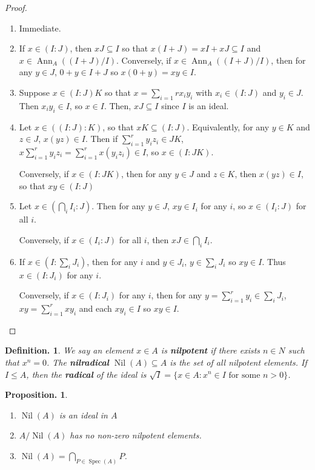 \documentclass[11pt, a4paper]{memoir}
\theoremstyle{change}
\newtheorem{proposition}[theorem]{Proposition.}
\theoremstyle{plain}
\theoremstyle{nonumberplain}
\newtheorem{definition}{Definition.}
\newtheorem{proof}{Proof}
\DeclareMathOperator{\Ann}{Ann}
\DeclareMathOperator{\Nil}{Nil}
\DeclareMathOperator{\Spec}{Spec}
\numberwithin{equation}{section}
\begin{document}
\begin{proof}
    \begin{enumerate}[nl,r]
        \item Immediate.
        \item If $x\in(I:J)$, then $xJ\subseteq I$ so that $x(I+J)=xI+xJ\subseteq I$ and $x\in\Ann_A((I+J)/I)$.
            Conversely, if $x\in\Ann_A((I+J)/I)$, then for any $y\in J$, $0+y\in I+J$ so $x(0+y)=xy\in I$.
        \item Suppose $x\in (I:J)K$ so that $x=\sum_{i=1}r x_iy_i$ with $x_i\in(I:J)$ and $y_i\in J$.
            Then $x_iy_i\in I$, so $x\in I$.
            Then, $xJ\subseteq I$ since $I$ is an ideal.
        \item Let $x\in((I:J):K)$, so that $xK\subseteq (I:J)$.
            Equivalently, for any $y\in K$ and $z\in J$, $x(yz)\in I$.
            Then if $\sum_{i=1}^r y_iz_i\in JK$, $x\sum_{i=1}^r y_iz_i=\sum_{i=1}^r x(y_iz_i)\in I$, so $x\in (I:JK)$.

            Conversely, if $x\in (I:JK)$, then for any $y\in J$ and $z\in K$, then $x(yz)\in I$, so that $xy\in (I:J)$
        \item Let $x\in\left(\bigcap_i I_i:J\right)$.
            Then for any $y\in J$, $xy\in I_i$ for any $i$, so $x\in (I_i:J)$ for all $i$.

            Conversely, if $x\in (I_i:J)$ for all $i$, then $xJ\in\bigcap_i I_i$.
        \item If $x\in\left(I:\sum_i J_i\right)$, then for any $i$ and $y\in J_i$, $y\in \sum_i J_i$ so $xy\in I$.
            Thus $x\in (I:J_i)$ for any $i$.

            Conversely, if $x\in (I:J_i)$ for any $i$, then for any $y=\sum_{i=1}^r y_i\in\sum_i J_i$, $xy=\sum_{i=1}^r xy_i$ and each $xy_i\in I$ so $xy\in I$.
    \end{enumerate}
\end{proof}
\begin{definition}
    We say an element $x\in A$ is \textbf{nilpotent} if there exists $n\in N$ such that $x^n=0$.
    The \textbf{nilradical} $\Nil(A)\subseteq A$ is the set of all nilpotent elements.
    If $I\leq A$, then the \textbf{radical} of the ideal is $\sqrt{I}=\{x\in A:x^n\in I\text{ for some $n>0$}\}$.
\end{definition}
\begin{proposition}
    \begin{enumerate}[nl,r]
        \item $\Nil(A)$ is an ideal in $A$
        \item $A/\Nil(A)$ has no non-zero nilpotent elements.
        \item $\Nil(A)=\bigcap_{P\in\Spec(A)}P$.
    \end{enumerate}
\end{proposition}
\end{document}
